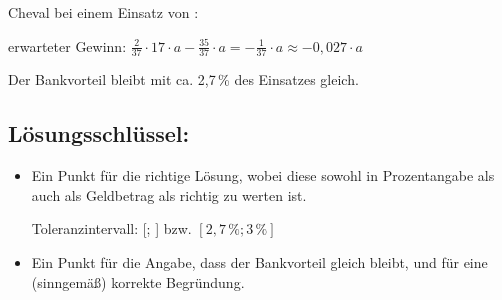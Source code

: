 \begin{langesbeispiel}
{\begin{enumerate}
	Cheval bei einem Einsatz von :
	
	erwarteter Gewinn: $\frac{2}{37}\cdot 17\cdot a-\frac{35}{37}\cdot a=-\frac{1}{37}\cdot a\approx -0,027\cdot a$
	
	Der Bankvorteil bleibt mit ca. 2,7\,\% des Einsatzes gleich.
	
	\subsection{Lösungsschlüssel:}
	
\begin{itemize}
	\item Ein Punkt für die richtige Lösung, wobei diese sowohl in Prozentangabe als auch als Geldbetrag als richtig zu werten ist. 
	
	Toleranzintervall: [; ] bzw. $[2,7\,\%; 3\,\%]$ 
	\item Ein Punkt für die Angabe, dass der Bankvorteil gleich bleibt, und für eine (sinngemäß) korrekte Begründung.  
\end{itemize}

\end{enumerate}}
		\end{langesbeispiel}